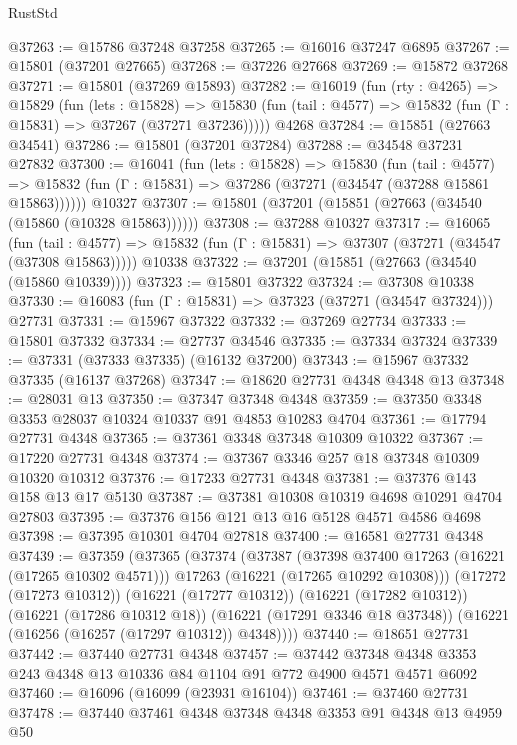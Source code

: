 \begin{lexlean}{RustStd}
\begin{coremodule}
@37263 := @15786 @37248 @37258
@37265 := @16016 @37247 @6895
@37267 := @15801 (@37201 @27665)
@37268 := @37226 @27668
@37269 := @15872 @37268
@37271 := @15801 (@37269 @15893)
@37282 := @16019
    (fun (rty : @4265) =>
    @15829
      (fun (lets : @15828) =>
      @15830 (fun (tail : @4577) => @15832 (fun (Γ : @15831) => @37267 (@37271 @37236)))))
    @4268
@37284 := @15851 (@27663 @34541)
@37286 := @15801 (@37201 @37284)
@37288 := @34548 @37231 @27832
@37300 := @16041
    (fun (lets : @15828) =>
    @15830
      (fun (tail : @4577) =>
      @15832 (fun (Γ : @15831) => @37286 (@37271 (@34547 (@37288 @15861 @15863))))))
    @10327
@37307 := @15801 (@37201 (@15851 (@27663 (@34540 (@15860 (@10328 @15863))))))
@37308 := @37288 @10327
@37317 := @16065
    (fun (tail : @4577) => @15832 (fun (Γ : @15831) => @37307 (@37271 (@34547 (@37308 @15863)))))
    @10338
@37322 := @37201 (@15851 (@27663 (@34540 (@15860 @10339))))
@37323 := @15801 @37322
@37324 := @37308 @10338
@37330 := @16083 (fun (Γ : @15831) => @37323 (@37271 (@34547 @37324))) @27731
@37331 := @15967 @37322
@37332 := @37269 @27734
@37333 := @15801 @37332
@37334 := @27737 @34546
@37335 := @37334 @37324
@37339 := @37331 (@37333 @37335) (@16132 @37200)
@37343 := @15967 @37332 @37335 (@16137 @37268)
@37347 := @18620 @27731 @4348 @4348 @13
@37348 := @28031 @13
@37350 := @37347 @37348 @4348
@37359 := @37350 @3348 @3353 @28037 @10324 @10337 @91 @4853 @10283 @4704
@37361 := @17794 @27731 @4348
@37365 := @37361 @3348 @37348 @10309 @10322
@37367 := @17220 @27731 @4348
@37374 := @37367 @3346 @257 @18 @37348 @10309 @10320 @10312
@37376 := @17233 @27731 @4348
@37381 := @37376 @143 @158 @13 @17 @5130
@37387 := @37381 @10308 @10319 @4698 @10291 @4704 @27803
@37395 := @37376 @156 @121 @13 @16 @5128 @4571 @4586 @4698
@37398 := @37395 @10301 @4704 @27818
@37400 := @16581 @27731 @4348
@37439 := @37359
    (@37365
      (@37374
        (@37387
          (@37398 @37400 @17263 (@16221 (@17265 @10302 @4571)))
          @17263
          (@16221 (@17265 @10292 @10308)))
        (@17272 (@17273 @10312))
        (@16221 (@17277 @10312))
        (@16221 (@17282 @10312))
        (@16221 (@17286 @10312 @18))
        (@16221 (@17291 @3346 @18 @37348))
        (@16221 (@16256 (@16257 (@17297 @10312)) @4348))))
@37440 := @18651 @27731
@37442 := @37440 @27731 @4348
@37457 := @37442 @37348 @4348 @3353 @243 @4348 @13 @10336 @84 @1104 @91 @772 @4900 @4571 @4571 @6092
@37460 := @16096 (@16099 (@23931 @16104))
@37461 := @37460 @27731
@37478 := @37440
    @37461
    @4348
    @37348
    @4348
    @3353
    @91
    @4348
    @13
    @4959
    @50

\end{coremodule}
\end{lexlean}
